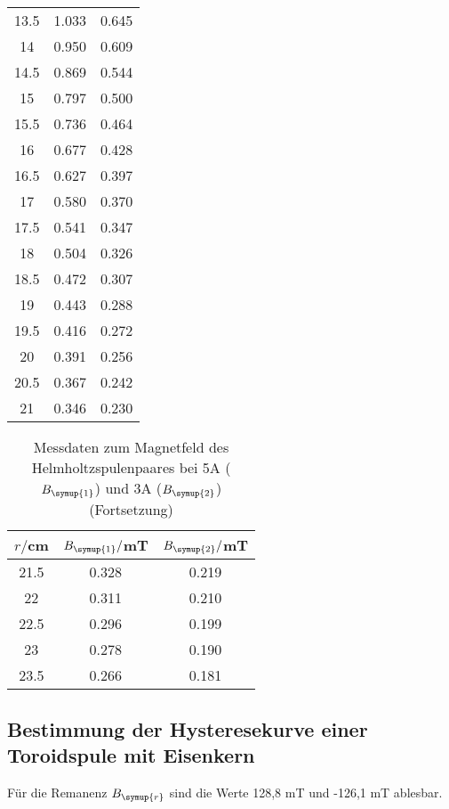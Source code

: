 \begin{table}
\begin{tabular}{c c c}
    13.5	&  1.033 & 0.645\\
    14	  &  0.950 & 0.609\\
    14.5	&  0.869 & 0.544\\
    15	  &  0.797 & 0.500\\
    15.5	&  0.736 & 0.464\\
    16	  &  0.677 & 0.428\\
    16.5	&  0.627 & 0.397\\
    17	  &  0.580 & 0.370\\
    17.5	&  0.541 & 0.347\\
    18	  &  0.504 & 0.326\\
    18.5	&  0.472 & 0.307\\
    19	  &  0.443 & 0.288\\
    19.5	&  0.416 & 0.272\\
    20	  &  0.391 & 0.256\\
    20.5	&  0.367 & 0.242\\
    21	  &  0.346 & 0.230\\
    \bottomrule
  \end{tabular}
\end{table}

\begin{table}
  \centering
  \caption{Messdaten zum Magnetfeld des Helmholtzspulenpaares bei 5A ($B_{\symup{1}}$)
  und 3A ($B_{\symup{2}}$)(Fortsetzung)}
  \label{tab:helmholtz}
  \begin{tabular}{c c c}
    \toprule
    $r/$cm & $B_{\symup{1}}/$mT & $B_{\symup{2}}/$mT\\
    \midrule
    21.5	&  0.328 & 0.219\\
    22	  &  0.311 & 0.210\\
    22.5	&  0.296 & 0.199\\
    23	  &  0.278 & 0.190\\
    23.5	&  0.266 & 0.181\\
    \bottomrule
  \end{tabular}
\end{table}








\subsection{Bestimmung der Hysteresekurve einer Toroidspule mit Eisenkern}

Für die Remanenz $B_{\symup{r}}$ sind die Werte 128,8 mT und -126,1 mT ablesbar.
